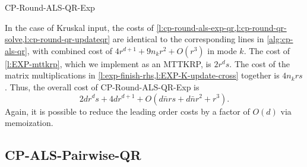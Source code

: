 \documentclass{article}
\begin{document}
\begin{algorithm}[!ht]
  \caption{CP-Round-ALS-QR-Exp}
  \label{alg:cp-als-qr-k}
  
\end{algorithm}

In the case of Kruskal input, the costs of \cref{l:cp-round-als-exp-qr,l:cp-round-qr-solve,l:cp-round-qr-updateqr} are identical to the corresponding lines in \cref{alg:cp-als-qr}, with combined cost of $4r^{d+1}+9n_kr^2+O(r^3)$ in mode $k$.
The cost of \cref{l:EXP-mttkrp}, which we implement as an MTTKRP, is $2r^ds$.
The cost of the matrix multiplications in \cref{l:exp-finish-rhs,l:EXP-K-update-cross} together is $4n_krs$.
Thus, the overall cost of CP-Round-ALS-QR-Exp is
$$ 2dr^ds + 4dr^{d+1} + O(d\bar{n}rs+d\bar{n}r^2 + r^3).$$
Again, it is possible to reduce the leading order costs by a factor of $O(d)$ via memoization.

\subsection{CP-ALS-Pairwise-QR}
\end{document}
